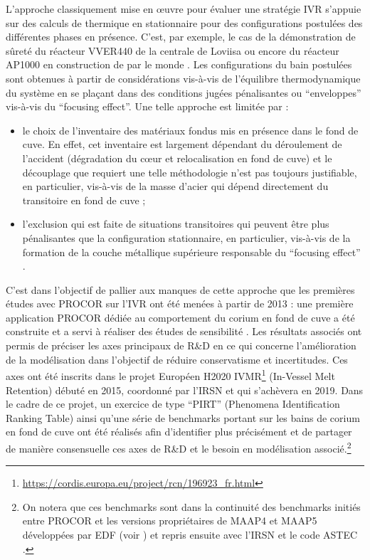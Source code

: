 L'approche classiquement mise en \oe{}uvre pour évaluer une stratégie IVR s'appuie sur des calculs de thermique en stationnaire pour des configurations postulées des différentes phases en présence. C'est, par exemple, le cas de la démonstration de sûreté du réacteur VVER440 de la centrale de Loviisa \cite{Kymalainen1997} ou encore du réacteur AP1000 en construction de par le monde \cite{Esmaili2004}. Les configurations du bain postulées sont obtenues à partir de considérations vis-à-vis de l'équilibre thermodynamique du système en se plaçant dans des conditions jugées pénalisantes ou ``enveloppes'' vis-à-vis du ``focusing effect''. Une telle approche est limitée par :
\begin{itemize}
 \item le choix de l'inventaire des matériaux fondus mis en présence dans le fond de cuve. En effet, cet inventaire est largement dépendant du déroulement de l'accident (dégradation du c\oe ur et relocalisation en fond de cuve) et le découplage que requiert une telle méthodologie n'est pas toujours justifiable, en particulier, vis-à-vis de la masse d'acier qui dépend directement du transitoire en fond de cuve \cite{Seiler2014} ;
 \item l’exclusion qui est faite de situations transitoires qui peuvent être plus pénalisantes que la configuration stationnaire, en particulier, vis-à-vis de la formation de la couche métallique supérieure responsable du ``focusing effect'' \cite{Rempe1998}.
\end{itemize}

C'est dans l'objectif de pallier aux manques de cette approche que les premières études avec PROCOR sur l'IVR ont été menées à partir de 2013 : une première application PROCOR dédiée au comportement du corium en fond de cuve a été construite et a servi à réaliser des études de sensibilité \cite{LeTellier2014}. Les résultats associés ont permis de préciser les axes principaux de R\&D en ce qui concerne l'amélioration de la modélisation dans l'objectif de réduire conservatisme et incertitudes. Ces axes ont été inscrits dans le projet Européen H2020 IVMR\footnote{\url{https://cordis.europa.eu/project/rcn/196923_fr.html}} (In-Vessel Melt Retention) débuté en 2015, coordonné par l'IRSN et qui s'achèvera en 2019. Dans le cadre de ce projet, un exercice de type ``PIRT'' (Phenomena Identification Ranking Table) \cite{Carenini2019a} ainsi qu'une série de benchmarks portant sur les bains de corium en fond de cuve \cite{Carenini2019} ont été réalisés afin d'identifier plus précisément et de partager de manière consensuelle ces axes de R\&D et le besoin en modélisation associé.\footnote{On notera que ces benchmarks sont dans la continuité des benchmarks initiés entre PROCOR et les versions propriétaires de MAAP4 \cite{maap4} et MAAP5 \cite{maap5} développées par EDF (voir \cite{Bakouta2015}) et repris ensuite avec l'IRSN et le code ASTEC \cite{Carenini2014}.}

